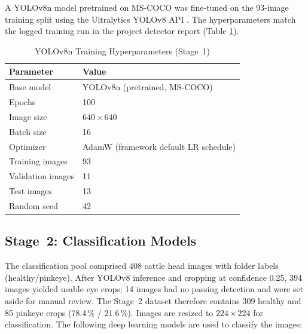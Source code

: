 \documentclass[preprint,12pt,authoryear]{elsarticle}
\begin{document}
A YOLOv8n model pretrained on MS-COCO was fine-tuned on the 93-image training split using the Ultralytics YOLOv8 API \citep{ultralytics2023yolov8}. The hyperparameters match the logged training run in the project detector report (Table \ref{yoloconfig}).

\begin{table}
  \caption{YOLOv8n Training Hyperparameters (Stage~1)}
  \label{yoloconfig}
  \centering
  \begin{tabular}{ll}
    \toprule
    \textbf{Parameter} & \textbf{Value} \\
    \midrule
    Base model        & YOLOv8n (pretrained, MS-COCO) \\
    Epochs            & 100 \\
    Image size        & $640 \times 640$ \\
    Batch size        & 16 \\
    Optimizer         & AdamW (framework default LR schedule) \\
    Training images   & 93 \\
    Validation images & 11 \\
    Test images       & 13 \\
    Random seed       & 42 \\
    \bottomrule
  \end{tabular}
\end{table}



\subsection{Stage~2: Classification Models}
\label{stage2}

The classification pool comprised 408 cattle head images with folder labels (healthy/pinkeye). After YOLOv8 inference and cropping at confidence 0.25, 394 images yielded usable eye crops; 14 images had no passing detection and were set aside for manual review. %
The Stage~2 dataset therefore contains 309 healthy and 85 pinkeye crops (78.4\,\% / 21.6\,\%). Images are resized to $224 \times 224$ for classification. The following deep learning models are used to classify the images: 
\end{document}
